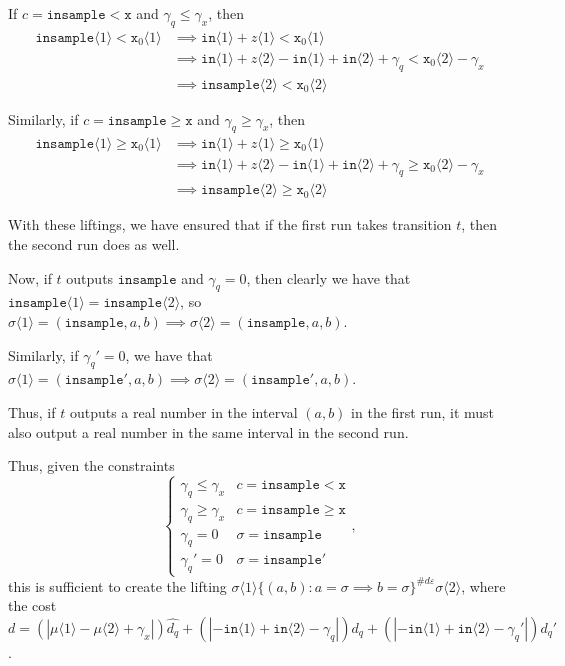 \documentclass[12pt]{article}
\newcommand{\gguard}[1][x]{\texttt{insample}\geq #1}
\newcommand{\lguard}[1][x]{\texttt{insample} < #1}
\newcommand{\brangle}[1]{\langle #1 \rangle}
\theoremstyle{definition}
\begin{document}
If $c=\lguard[\texttt{x}]$ and $\gamma_q\leq \gamma_x$, then \begin{align*}
    \texttt{insample}\brangle{1}<\texttt{x}_0\brangle{1}&\implies \texttt{in}\brangle{1}+z\brangle{1}<\texttt{x}_0\brangle{1}\\
    &\implies \texttt{in}\brangle{1}+z\brangle{2}-\texttt{in}\brangle{1}+\texttt{in}\brangle{2}+\gamma_q<\texttt{x}_0\brangle{2}-\gamma_x\\
    &\implies \texttt{insample}\brangle{2}<\texttt{x}_0\brangle{2}
\end{align*}

Similarly, if $c=\gguard[\texttt{x}]$ and $\gamma_q\geq \gamma_x$, then \begin{align*}
    \texttt{insample}\brangle{1}\geq \texttt{x}_0\brangle{1}&\implies \texttt{in}\brangle{1}+z\brangle{1}\geq \texttt{x}_0\brangle{1}\\
    &\implies \texttt{in}\brangle{1}+z\brangle{2}-\texttt{in}\brangle{1}+\texttt{in}\brangle{2}+\gamma_q\geq \texttt{x}_0\brangle{2}-\gamma_x\\
    &\implies \texttt{insample}\brangle{2}\geq \texttt{x}_0\brangle{2}
\end{align*}

With these liftings, we have ensured that if the first run takes transition $t$, then the second run does as well. 

Now, if $t$ outputs $\texttt{insample}$ and $\gamma_q=0$, then clearly we have that $\texttt{insample}\brangle{1}=\texttt{insample}\brangle{2}$, so $\sigma\brangle{1} = (\texttt{insample}, a, b)\implies \sigma\brangle{2}=(\texttt{insample}, a, b)$.

Similarly, if $\gamma_q'=0$, we have that $\sigma\brangle{1} = (\texttt{insample}', a, b)\implies \sigma\brangle{2}=(\texttt{insample}', a, b)$. 

Thus, if $t$ outputs a real number in the interval $(a, b)$ in the first run, it must also output a real number in the same interval in the second run. 

Thus, given the constraints \[
  \begin{cases}
    \gamma_q\leq\gamma_x & c = \lguard[\texttt{x}]\\
    \gamma_q\geq\gamma_x & c = \gguard[\texttt{x}]\\
    \gamma_q=0 & \sigma = \texttt{insample}\\
    \gamma_q'=0 & \sigma = \texttt{insample}'
  \end{cases},
\]
this is sufficient to create the lifting $\sigma\brangle{1}\{(a, b): a=\sigma\implies b=\sigma\}^{\#d\varepsilon}\sigma\brangle{2}$, where the cost $d = (|\mu\brangle{1}-\mu\brangle{2}+\gamma_x|)\hat{d_q}+(|-\texttt{in}\brangle{1}+\texttt{in}\brangle{2}-\gamma_q|)d_q+(|-\texttt{in}\brangle{1}+\texttt{in}\brangle{2}-\gamma_q'|)d_q'$. 
\end{document}
